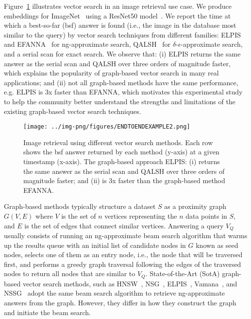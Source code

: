 Figure~\ref{fig:use_case} illustrates vector search in an image retrieval use case. We produce embeddings for ImageNet~\cite{imagenet} using a ResNet50 model~\cite{resnet}. 
We report the time at which a best-so-far (bsf) answer is found (i.e., the image in the database most similar to the query) by vector search techniques from different families: ELPIS~\cite{elpis} and EFANNA~\cite{efanna} for ng-approximate search, QALSH~\cite{qalsh} for $\delta$-$\epsilon$-approximate search, and a serial scan for exact search. We observe that: (i) ELPIS returns the same answer as the serial scan and QALSH over three orders of magnitude faster, which explains the popularity of graph-based vector search in many real applications; and (ii) not all graph-based methods have the same performance, e.g. ELPIS is 3x faster than EFANNA, which motivates this experimental study to help the community better understand the strengths and limitations of the existing graph-based vector search techniques.

\begin{figure}[htb] 
		\texttt{[image: ../img-png/figures/ENDTOENDEXAMPLE2.png]}
		\caption{
  Image retrieval using different vector search methods. Each row shows the bsf answer returned by each method (y-axis) at a given timestamp (x-axis). The graph-based approach ELPIS: (i) returns the same answer as the serial scan and QALSH over three orders of magnitude faster; and
  (ii) is 3x faster than the graph-based method EFANNA. 
  }        
		\label{fig:use_case}
 \end{figure}

Graph-based methods typically structure a dataset ${S}$ as a proximity graph $G\left({V},{E}\right)$ where ${V}$ is the set of $n$ vertices representing the $n$ data points in ${S}$, and ${E}$ is the set of edges that connect similar vertices.
Answering a query $V_Q$ usually consists of running an ng-approximate beam search algorithm that warms up the results queue with an initial list of candidate nodes in $G$ known as seed nodes, selects one of them as an entry node, i.e., the node that will be traversed first, and performs a greedy graph traversal following the edges of the traversed nodes to return all nodes that are similar to $V_Q$. State-of-the-Art (SotA) graph-based vector search methods, such as HNSW~\cite{hnsw}, NSG~\cite{nsg}, ELPIS~\cite{elpis}, Vamana~\cite{vamana}, and NSSG~\cite{nssg} adopt the same beam search algorithm to retrieve ng-approximate answers from the graph. %
However, they differ %
in how they construct the graph and initiate the beam search. 


